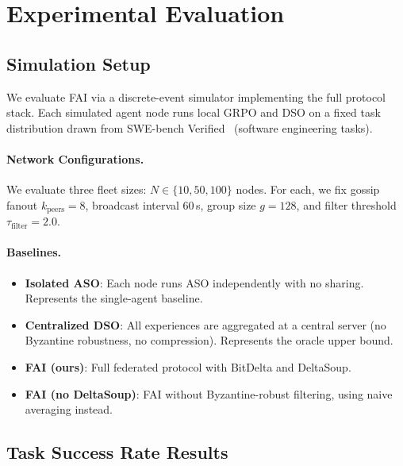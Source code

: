 \section{Experimental Evaluation}

\label{sec:evaluation}

\subsection{Simulation Setup}

We evaluate FAI via a discrete-event simulator implementing the full protocol
stack. Each simulated agent node runs local GRPO and DSO on a fixed task
distribution drawn from SWE-bench Verified~\cite{jimenez2024swebench}
(software engineering tasks).

\paragraph{Network Configurations.}
We evaluate three fleet sizes: $N \in \{10, 50, 100\}$ nodes. For each,
we fix gossip fanout $k_{\text{peers}} = 8$, broadcast interval 60\,s,
group size $g = 128$, and filter threshold $\tau_{\text{filter}} = 2.0$.

\paragraph{Baselines.}
\begin{itemize}[leftmargin=1.5em]
    \item \textbf{Isolated ASO}: Each node runs ASO independently with no
          sharing. Represents the single-agent baseline.
    \item \textbf{Centralized DSO}: All experiences are aggregated at a
          central server (no Byzantine robustness, no compression).
          Represents the oracle upper bound.
    \item \textbf{FAI (ours)}: Full federated protocol with BitDelta and DeltaSoup.
    \item \textbf{FAI (no DeltaSoup)}: FAI without Byzantine-robust filtering,
          using naive averaging instead.
\end{itemize}

\subsection{Task Success Rate Results}

